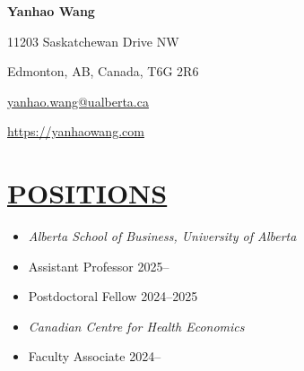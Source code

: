 \documentclass{res}
\begin{document}
\begin{resume}

\vspace{-50pt}

\begin{center}
  {\huge \textbf{Yanhao Wang}}
\end{center}

\setlength{\columnsep}{0.6cm}
\begin{multicols}{2}
{\small 11203 Saskatchewan Drive NW}

\vspace{-13pt}
{\small Edmonton, AB, Canada, T6G 2R6} 

\columnbreak
{\small \hfill \href{mailto:yanhao.wang@ualberta.ca}{yanhao.wang@ualberta.ca}}

\vspace{-13pt}
{\small \hfill \url{https://yanhaowang.com}}


\end{multicols}

\section{\large{\ul{POSITIONS}}}
\vspace{1.8em}
\begin{itemize}[leftmargin=!,labelindent=-15pt,itemindent=-15pt,itemsep=0.1em]
  \item[] \textit{Alberta School of Business, University of Alberta}
  \item[] \hspace{15pt} Assistant Professor \hfill    2025--
  \item[] \hspace{15pt} Postdoctoral Fellow \hfill    2024--2025
  \item[] \textit{Canadian Centre for Health Economics} 
  \item[] \hspace{15pt} Faculty Associate \hfill    2024--
\end{itemize}


\end{resume}
\end{document}
